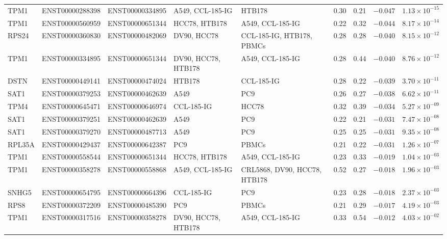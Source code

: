 \begin{landscape}
\begin{longtable}{@{} l l l >{\raggedright\arraybackslash}p{3.4cm} >{\raggedright\arraybackslash}p{3.4cm} r r r r @{}}
TPM1   & ENST00000288398 & ENST00000334895 & A549, CCL-185-IG & HTB178 & 0.30 & 0.21 & $-0.047$ & $1.13 \times 10^{-15}$ \\
TPM1   & ENST00000560959 & ENST00000651344 & HCC78, HTB178 & A549, CCL-185-IG & 0.22 & 0.32 & $-0.044$ & $8.17 \times 10^{-14}$ \\
RPS24  & ENST00000360830 & ENST00000482069 & DV90, HCC78 & CCL-185-IG, HTB178, PBMCs & 0.28 & 0.28 & $-0.040$ & $8.15 \times 10^{-12}$ \\
TPM1   & ENST00000334895 & ENST00000651344 & DV90, HCC78, HTB178 & A549, CCL-185-IG & 0.28 & 0.44 & $-0.040$ & $8.76 \times 10^{-12}$ \\
DSTN   & ENST00000449141 & ENST00000474024 & HTB178 & CCL-185-IG & 0.28 & 0.22 & $-0.039$ & $3.70 \times 10^{-11}$ \\
SAT1   & ENST00000379253 & ENST00000462639 & A549 & PC9 & 0.26 & 0.27 & $-0.038$ & $6.62 \times 10^{-11}$ \\
TPM4   & ENST00000645471 & ENST00000646974 & CCL-185-IG & HCC78 & 0.32 & 0.39 & $-0.034$ & $5.27 \times 10^{-09}$ \\
SAT1   & ENST00000379251 & ENST00000462639 & A549 & PC9 & 0.22 & 0.21 & $-0.031$ & $7.47 \times 10^{-08}$ \\
SAT1   & ENST00000379270 & ENST00000487713 & A549 & PC9 & 0.25 & 0.25 & $-0.031$ & $9.35 \times 10^{-08}$ \\
RPL35A & ENST00000429437 & ENST00000642387 & PC9 & PBMCs & 0.21 & 0.22 & $-0.031$ & $1.26 \times 10^{-07}$ \\
TPM1   & ENST00000558544 & ENST00000651344 & HCC78, HTB178 & A549, CCL-185-IG & 0.23 & 0.33 & $-0.019$ & $1.04 \times 10^{-03}$ \\
TPM1   & ENST00000358278 & ENST00000558868 & A549, CCL-185-IG & CRL5868, DV90, HCC78, HTB178 & 0.52 & 0.27 & $-0.018$ & $1.96 \times 10^{-03}$ \\
SNHG5  & ENST00000654795 & ENST00000664396 & CCL-185-IG & PC9 & 0.23 & 0.28 & $-0.018$ & $2.37 \times 10^{-03}$ \\
RPS8   & ENST00000372209 & ENST00000485390 & PC9 & PBMCs & 0.21 & 0.29 & $-0.017$ & $4.19 \times 10^{-03}$ \\
TPM1   & ENST00000317516 & ENST00000358278 & DV90, HCC78, HTB178 & A549, CCL-185-IG & 0.33 & 0.54 & $-0.012$ & $4.03 \times 10^{-02}$ \\
\end{longtable}
\endgroup
\end{landscape}


